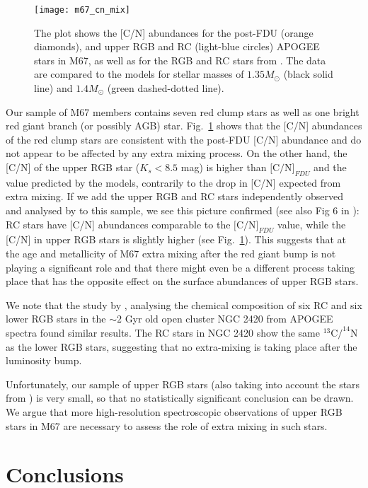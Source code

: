 \documentclass[a4paper,fleqn,usenatbib]{mnras}
\begin{document}
\begin{figure}
	\texttt{[image: m67\_cn\_mix]}
	\caption{The plot shows the  [C/N] abundances for the post-FDU (orange diamonds),  and upper RGB and RC (light-blue circles) APOGEE stars in M67, as well as for the RGB and RC stars from \citet{tautv2000}. The data are compared to the models for stellar masses of $1.35 M_{\odot}$ (black solid line) and $1.4 M_{\odot}$ (green dashed-dotted line).}
	\label{fig:cn_mix}
\end{figure}


Our sample of M67 members contains seven red clump stars as well as one bright red giant branch (or possibly AGB) star. Fig.~\ref{fig:cn_mix} shows that the [C/N] abundances of the red clump stars are consistent with the post-FDU [C/N] abundance and do not appear to be affected by any extra mixing process. On the other hand, the [C/N] of the upper RGB  star ($K_s<8.5$ mag) is higher than $\text{[C/N]}_{FDU}$ and the value predicted by the models, contrarily to the drop in [C/N] expected from extra mixing. If we add the upper RGB and RC stars independently observed and analysed by \citet{tautv2000} to this sample, we see this picture confirmed (see also Fig 6 in \citealt{tautv2000}): RC stars have [C/N] abundances comparable to the $\text{[C/N]}_{FDU}$ value, while the [C/N] in upper RGB stars is slightly higher (see Fig.~\ref{fig:cn_mix}). This suggests that at the age and metallicity of M67 extra mixing after the red giant bump is not playing a significant role and that there might even be a different process taking place that has the opposite effect on the surface abundances of upper RGB stars.

We note that the study by \citet{souto2016}, analysing the chemical composition of six RC and six lower RGB stars in the $\sim2$ Gyr old open cluster NGC 2420 from APOGEE spectra found similar results. The RC stars in NGC 2420 show the same $^{13}\text{C}/^{14}\text{N}$ as the lower RGB stars, suggesting that no extra-mixing is taking place after the luminosity bump. 

Unfortunately, our sample of upper RGB stars (also taking into account the stars from \citealt{tautv2000}) is very small, so that no statistically significant conclusion can be drawn. We argue that more high-resolution spectroscopic observations of upper RGB stars in M67 are necessary to assess the role of extra mixing in such stars. 


\section{Conclusions}
\end{document}
